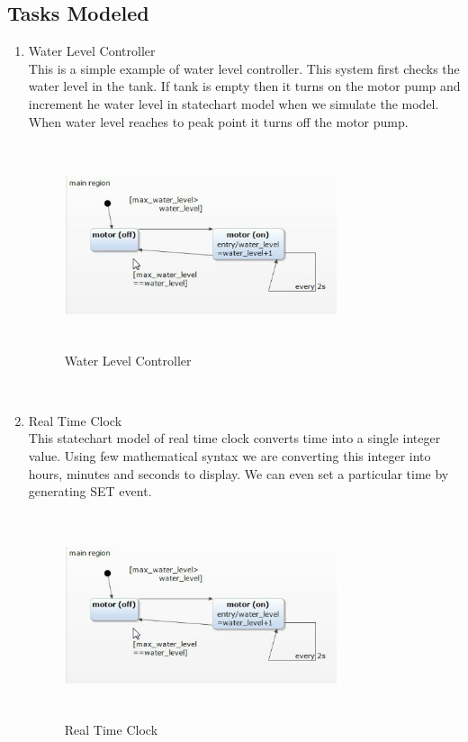 \documentclass{article}
\begin{document}
\subsection{Tasks Modeled}
\begin{enumerate}
    \item Water Level Controller\\
    This is a simple example of water level controller. This system first checks the water level in the tank. If tank is empty then it turns on the motor pump and increment he water level in statechart model when we simulate the model. When water level reaches to peak point it turns off the motor pump.\\
    \begin{figure}[h]
\centering
\includegraphics[width=8cm,height=6cm]{Screenshot006.jpg}
\caption{Water Level Controller}
\end{figure}\\
\newpage
\item Real Time Clock\\
This statechart model of real time clock converts time into a single integer value. Using few mathematical syntax we are converting this integer into hours, minutes and seconds to display. We can even set a particular time by generating SET event.\\
\begin{figure}[h]
\centering
\includegraphics[width=8cm,height=6cm]{Screenshot006.jpg}
\caption{Real Time Clock}
\end{figure}\\
\end{enumerate}
\end{document}
